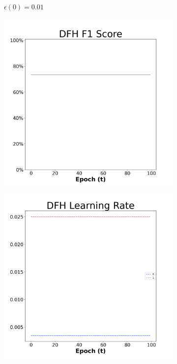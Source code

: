 \begin{figure}[H]
\begin{subfigure}{0.3\textwidth}
  \caption{$\epsilon(0)=0.01$}
\end{subfigure}\hfil %
\begin{subfigure}{0.3\textwidth}
  \includegraphics[width=\linewidth]{images/exper2/SP/DFH_0.03_f1.png}
  \includegraphics[width=\linewidth]{images/exper2/SP/DFH_0.03_lr.png}

\end{subfigure}
\end{figure}
